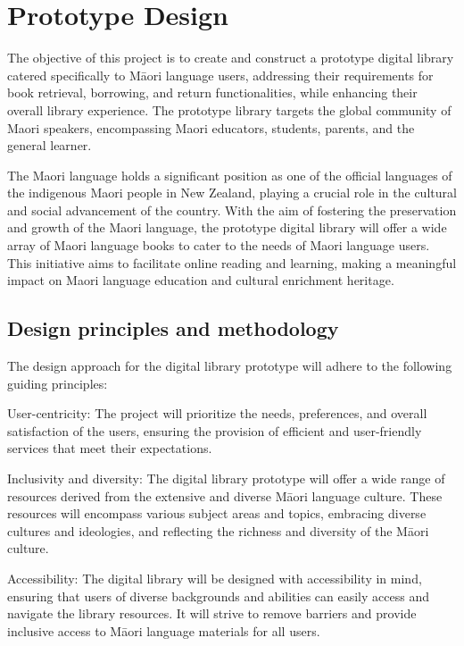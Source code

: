 \chapter{Prototype Design}

The objective of this project is to create and construct a prototype digital library catered specifically to Māori language users, addressing their requirements for book retrieval, borrowing, and return functionalities, while enhancing their overall library experience. The prototype library targets the global community of Maori speakers, encompassing Maori educators, students, parents, and the general learner.

The Maori language holds a significant position as one of the official languages of the indigenous Maori people in New Zealand, playing a crucial role in the cultural and social advancement of the country. With the aim of fostering the preservation and growth of the Maori language, the prototype digital library will offer a wide array of Maori language books to cater to the needs of Maori language users. This initiative aims to facilitate online reading and learning, making a meaningful impact on Maori language education and cultural enrichment heritage\cite{Discover30:online}.

\section{Design principles and methodology}

The design approach for the digital library prototype will adhere to the following guiding principles:

User-centricity: The project will prioritize the needs, preferences, and overall satisfaction of the users, ensuring the provision of efficient and user-friendly services that meet their expectations.

Inclusivity and diversity: The digital library prototype will offer a wide range of resources derived from the extensive and diverse Māori language culture. These resources will encompass various subject areas and topics, embracing diverse cultures and ideologies, and reflecting the richness and diversity of the Māori culture.

Accessibility: The digital library will be designed with accessibility in mind, ensuring that users of diverse backgrounds and abilities can easily access and navigate the library resources. It will strive to remove barriers and provide inclusive access to Māori language materials for all users.

